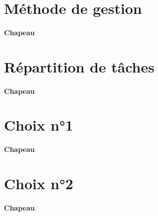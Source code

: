 \section{Méthode de gestion} \label{sec:methodeGestion}

\paragraph{Chapeau}


\section{Répartition de tâches} \label{sec:repartTaches}

\paragraph{Chapeau}


\section{Choix n°1} \label{sec:gestionC1}

\paragraph{Chapeau}


\section{Choix n°2} \label{sec:gestionC2}

\paragraph{Chapeau}

